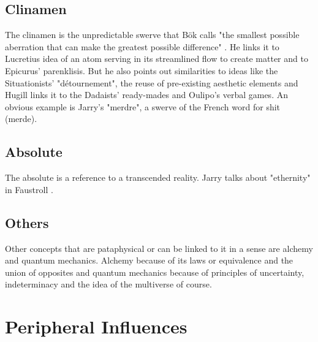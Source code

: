 \subsection{Clinamen}

The clinamen is the unpredictable swerve that Bök calls "the smallest possible aberration that can make the greatest possible difference"  \citep[p.43]{Bok2002}. He links it to Lucretius idea of an atom serving in its streamlined flow to create matter and to Epicurus' parenklisis. But he also points out similarities to ideas like the Situationists' "détournement", the reuse of pre-existing aesthetic elements and Hugill links it to the Dadaists' ready-mades and Oulipo's verbal games. An obvious example is Jarry's "merdre", a swerve of the French word for shit (merde).

\subsection{Absolute}

The absolute is a reference to a transcended reality. Jarry talks about "ethernity" in Faustroll \citep[p.104]{Jarry1996}.

\subsection*{Others}

Other concepts that are pataphysical or can be linked to it in a sense are alchemy and quantum mechanics. Alchemy because of its laws or equivalence and the union of opposites \citep{Hugill2012} and quantum mechanics because of principles of uncertainty, indeterminacy and the idea of the multiverse of course.

\section{Peripheral Influences}

